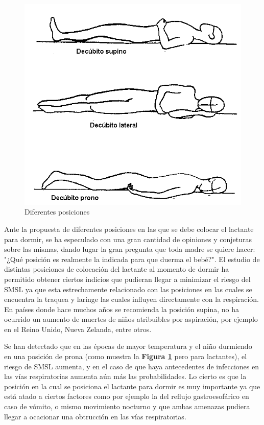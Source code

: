\documentclass{IEEEtran}
\begin{document}
			\begin{figure}
				\centering
				\includegraphics[width=1\linewidth]{posiciones}
				\caption{Diferentes posiciones}
				\label{posiciones}
			\end{figure}

			Ante la propuesta de diferentes posiciones en las que se debe colocar el lactante para dormir, se ha especulado con una gran cantidad de opiniones y conjeturas sobre las mismas, dando lugar la gran pregunta que toda madre se quiere hacer: "¿Qué posición es realmente la indicada para que duerma el bebé?". El estudio de distintas posiciones de colocación del lactante al momento de dormir ha permitido obtener ciertos indicios que pudieran llegar a minimizar el riesgo del SMSL ya que esta estrechamente relacionado con las posiciones en las cuales se encuentra la traquea y laringe las cuales influyen directamente con la respiración. En países donde hace muchos años se recomienda la posición supina, no ha ocurrido un aumento de muertes de niños atribuibles por aspiración, por ejemplo en el Reino Unido, Nueva Zelanda, entre otros.

			Se han detectado que en las épocas de mayor temperatura y el niño durmiendo en una posición de prona (como muestra la \textbf{Figura \ref{posiciones}} pero para lactantes), el riesgo de SMSL aumenta, y en el caso de que haya antecedentes de infecciones en las vías respiratorias aumenta aún más las probabilidades. Lo cierto es que la posición en la cual se posiciona el lactante para dormir es muy importante ya que está atado a ciertos factores como por ejemplo la del reflujo gastroesofárico en caso de vómito, o mismo movimiento nocturno y que ambas amenazas pudiera llegar a ocacionar una obtrucción en las vías respiratorias.
\end{document}
